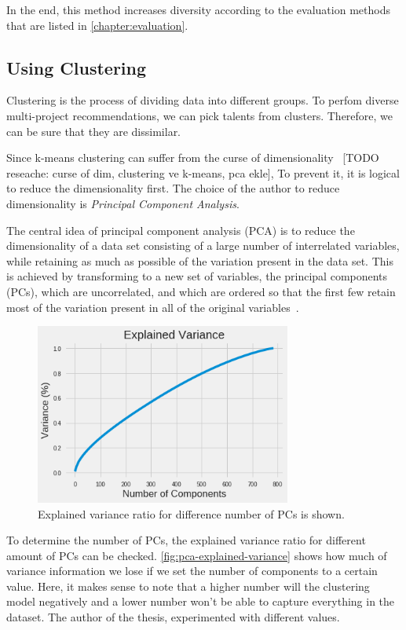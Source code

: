 In the end, this method increases diversity according to the evaluation methods that are listed in \autoref{chapter:evaluation}.

\subsection{Using Clustering}

Clustering is the process of dividing data into different groups. To perfom diverse multi-project recommendations, we can pick talents from clusters. Therefore, we can be sure that they are dissimilar. 

Since k-means clustering can suffer from the curse of dimensionality~\parencite{steinbach2004challenges} [TODO reseache: curse of dim, clustering ve k-means, pca ekle], To prevent it, it is logical to reduce the dimensionality first. The choice of the author to reduce dimensionality is \textit{Principal Component Analysis}.

The central idea of principal component analysis (PCA) is to reduce the
dimensionality of a data set consisting of a large number of interrelated
variables, while retaining as much as possible of the variation present in
the data set. This is achieved by transforming to a new set of variables,
the principal components (PCs), which are uncorrelated, and which are
ordered so that the first few retain most of the variation present in all of
the original variables~\parencite{jolliffe2011principal}. 

 \begin{figure}[!ht]
	\centering
	\includegraphics[width=0.75\textwidth]{figures/PCAExplainedVariance.png}
	\caption{Explained variance ratio for difference number of PCs is shown.}
	\label{fig:pca-explained-variance}
\end{figure}

To determine the number of PCs, the explained variance ratio for different amount of PCs can be checked. \autoref{fig:pca-explained-variance} shows how much of variance information we lose if we set the number of components to a certain value. Here, it makes sense to note that a higher number will the clustering model negatively and a lower number won't be able to capture everything in the dataset. The author of the thesis, experimented with different values.

